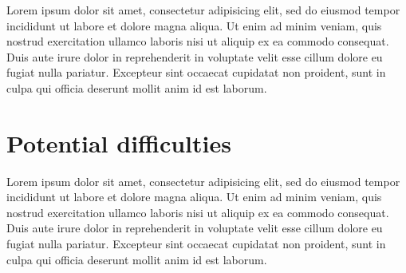 \documentclass[11pt]{article}
\begin{document}
Lorem ipsum dolor sit amet, consectetur adipisicing elit, sed do eiusmod tempor
incididunt ut labore et dolore magna aliqua. Ut enim ad minim veniam, quis
nostrud exercitation ullamco laboris nisi ut aliquip ex ea commodo consequat.
Duis aute irure dolor in reprehenderit in voluptate velit esse cillum dolore eu
fugiat nulla pariatur. Excepteur sint occaecat cupidatat non proident, sunt in
culpa qui officia deserunt mollit anim id est laborum.

\section{Potential difficulties}
Lorem ipsum dolor sit amet, consectetur adipisicing elit, sed do eiusmod tempor
incididunt ut labore et dolore magna aliqua. Ut enim ad minim veniam, quis
nostrud exercitation ullamco laboris nisi ut aliquip ex ea commodo consequat.
Duis aute irure dolor in reprehenderit in voluptate velit esse cillum dolore eu
fugiat nulla pariatur. Excepteur sint occaecat cupidatat non proident, sunt in
culpa qui officia deserunt mollit anim id est laborum.
\end{document}
